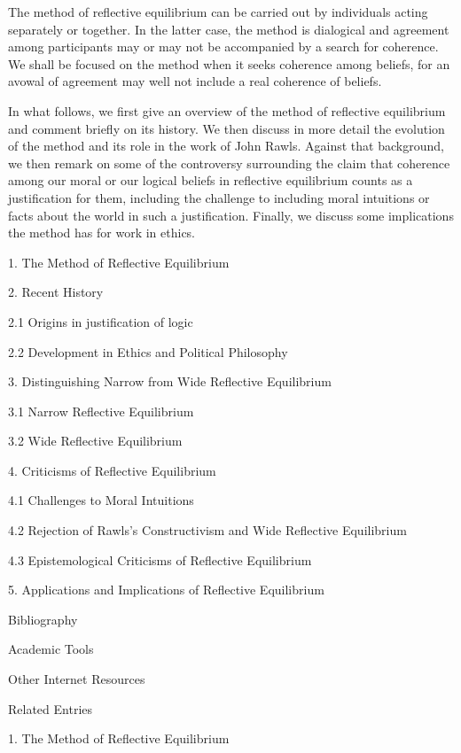 \documentclass[]{article}
\begin{document}
The method of reflective equilibrium can be carried out by individuals
acting separately or together. In the latter case, the method is
dialogical and agreement among participants may or may not be
accompanied by a search for coherence. We shall be focused on the method
when it seeks coherence among beliefs, for an avowal of agreement may
well not include a real coherence of beliefs.

In what follows, we first give an overview of the method of reflective
equilibrium and comment briefly on its history. We then discuss in more
detail the evolution of the method and its role in the work of John
Rawls. Against that background, we then remark on some of the
controversy surrounding the claim that coherence among our moral or our
logical beliefs in reflective equilibrium counts as a justification for
them, including the challenge to including moral intuitions or facts
about the world in such a justification. Finally, we discuss some
implications the method has for work in ethics.

1. The Method of Reflective Equilibrium

2. Recent History

2.1 Origins in justification of logic

2.2 Development in Ethics and Political Philosophy

3. Distinguishing Narrow from Wide Reflective Equilibrium

3.1 Narrow Reflective Equilibrium

3.2 Wide Reflective Equilibrium

4. Criticisms of Reflective Equilibrium

4.1 Challenges to Moral Intuitions

4.2 Rejection of Rawls's Constructivism and Wide Reflective Equilibrium

4.3 Epistemological Criticisms of Reflective Equilibrium

5. Applications and Implications of Reflective Equilibrium

Bibliography

Academic Tools

Other Internet Resources

Related Entries

\hypertarget{main-text}{}
\protect\hypertarget{MetRefEqu}{}{1. The Method of Reflective
Equilibrium}
\end{document}
